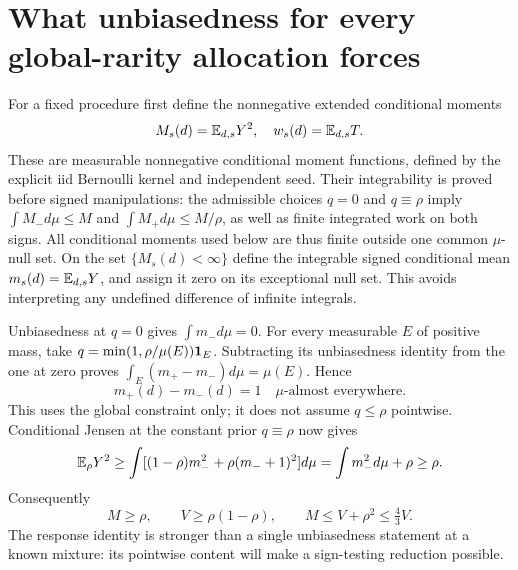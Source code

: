 \section{What unbiasedness for every global-rarity allocation forces}
For a fixed procedure first define the nonnegative extended conditional moments
\[
 M_s(d)=\mathbb E_{d,s}Y^2,
 \quad w_s(d)=\mathbb E_{d,s}T.
\]
These are measurable nonnegative conditional moment functions, defined by the
explicit iid Bernoulli kernel and independent seed. Their integrability is
proved before signed manipulations: the admissible choices $q=0$ and
$q\equiv\rho$ imply $\int M_-d\mu\le M$ and
$\int M_+d\mu\le M/\rho$, as well as finite integrated work on both signs.
All conditional moments used below are thus finite outside one common
$\mu$-null set. On the set $\{M_s(d)<\infty\}$ define the integrable signed
conditional mean $m_s(d)=\mathbb E_{d,s}Y$, and assign it zero on its exceptional null
set. This avoids interpreting any undefined difference of infinite integrals.

Unbiasedness at $q=0$ gives $\int m_-d\mu=0$.
For every measurable $E$ of positive mass, take
$q=\min(1,\rho/\mu(E))\mathbf1_E$. Subtracting its unbiasedness identity from
the one at zero proves $\int_E(m_+-m_-)d\mu=\mu(E)$.
Hence
\[
 m_+(d)-m_-(d)=1\quad\mu\text{-almost everywhere}.         \tag{5}
\]
This uses the global constraint only; it does not assume $q\le\rho$ pointwise.
Conditional Jensen at the constant prior $q\equiv\rho$ now gives
\[
 \mathbb E_\rho Y^2\ge\int[(1-\rho)m_-^2+\rho(m_-+1)^2]d\mu
               =\int m_-^2d\mu+\rho\ge\rho.
\]
Consequently
\[
 M\ge\rho,\qquad V\ge\rho(1-\rho),\qquad
 M\le V+\rho^2\le\tfrac43V.                             \tag{6}
\]
The response identity is stronger than a single unbiasedness statement at a
known mixture: its pointwise content will make a sign-testing reduction possible.

